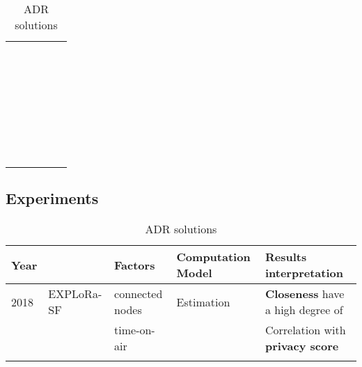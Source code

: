 \begin{longtable}{lllll}
	\     &                                                &                               &                                        &                                                               \\
	\     &                                                &                               &                                        &                                                               \\
	\     &                                                &                               &                                        &                                                               \\
	\     &                                                &                               &                                        &                                                               \\
	\     &                                                &                               &                                        &                                                               \\
	\     &                                                &                               &                                        &                                                               \\


\caption{ADR solutions}
\end{longtable}


\subsection{Experiments}
\begin{longtable}{lllll}
	Year  & \                                              & \textbf{Factors}           & \textbf{Computation Model}             & \textbf{Results interpretation}                               \\\hline
	2018  & EXPLoRa-SF \cite{cuomo_explora_2017}           & connected nodes            & Estimation                             & \textbf{Closeness} have a high degree of                      \\
	\     &                                                & time-on-air                &                                        & Correlation with \textbf{privacy score}                       \\\hline

\caption{ADR solutions}
\end{longtable}


